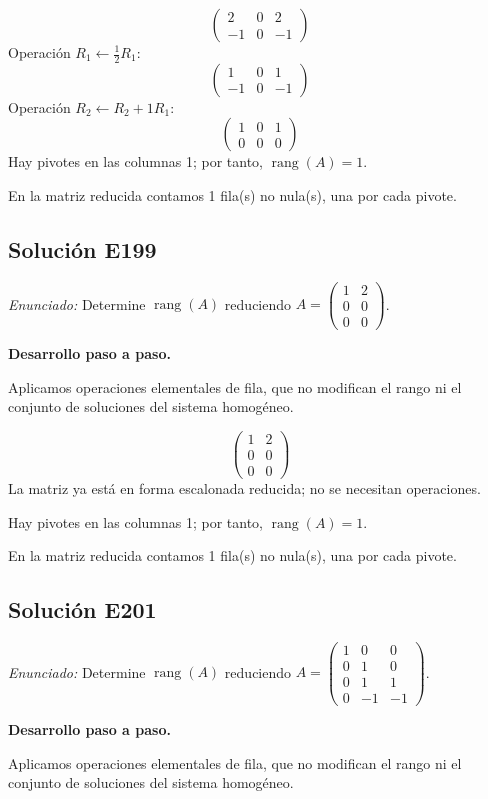 \documentclass[12pt]{article}
\theoremstyle{remark}
\newcommand{\rang}{\operatorname{rang}}
\newcommand{\solucion}[2]{\Needspace{11\baselineskip}\subsection*{Solución E#1}\noindent\textit{Enunciado:} #2\par\medskip\noindent\textbf{Desarrollo paso a paso.}\par\medskip}
\begin{document}
\[
\begin{pmatrix}2&0&2\\-1&0&-1\end{pmatrix}
\]
Operación $R_{1}\leftarrow \frac{1}{2}R_{1}$:
\[
\begin{pmatrix}1&0&1\\-1&0&-1\end{pmatrix}
\]
Operación $R_{2}\leftarrow R_{2}+1R_{1}$:
\[
\begin{pmatrix}1&0&1\\0&0&0\end{pmatrix}
\]
Hay pivotes en las columnas 1; por tanto, $\boxed{\rang(A)=1}$.

En la matriz reducida contamos 1 fila(s) no nula(s), una por cada pivote.


\medskip

\solucion{199}{Determine $\rang(A)$ reduciendo $A=\begin{pmatrix}1&2\\0&0\\0&0\end{pmatrix}$.}
Aplicamos operaciones elementales de fila, que no modifican el rango ni el conjunto de soluciones del sistema homogéneo.

\[
\begin{pmatrix}1&2\\0&0\\0&0\end{pmatrix}
\]
La matriz ya está en forma escalonada reducida; no se necesitan operaciones.

Hay pivotes en las columnas 1; por tanto, $\boxed{\rang(A)=1}$.

En la matriz reducida contamos 1 fila(s) no nula(s), una por cada pivote.


\medskip

\solucion{201}{Determine $\rang(A)$ reduciendo $A=\begin{pmatrix}1&0&0\\0&1&0\\0&1&1\\0&-1&-1\end{pmatrix}$.}
Aplicamos operaciones elementales de fila, que no modifican el rango ni el conjunto de soluciones del sistema homogéneo.
\end{document}
